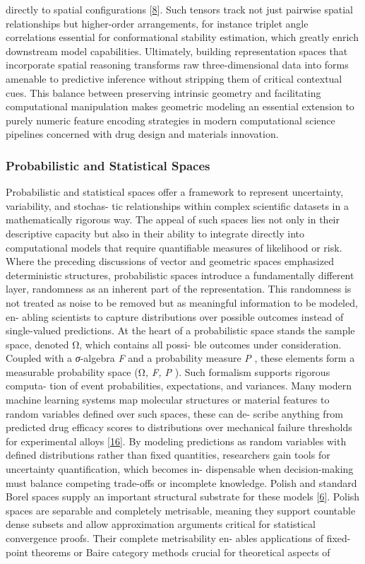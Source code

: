 \documentclass[
]{article}
\begin{document}
directly to spatial configurations {[}\hyperref[_bookmark48]{8}{]}. Such
tensors track not just pairwise spatial relationships but higher-order
arrangements, for instance triplet angle correlations essential for
conformational stability estimation, which greatly enrich downstream
model capabilities. Ultimately, building representation spaces that
incorporate spatial reasoning transforms raw three-dimensional data into
forms amenable to predictive inference without stripping them of
critical contextual cues. This balance between preserving intrinsic
geometry and facilitating computational manipulation makes geometric
modeling an essential extension to purely numeric feature encoding
strategies in modern computational science pipelines concerned with drug
design and materials innovation.

\subsubsection{Probabilistic and Statistical
Spaces}\label{probabilistic-and-statistical-spaces}

Probabilistic and statistical spaces offer a framework to represent
uncertainty, variability, and stochas- tic relationships within complex
scientific datasets in a mathematically rigorous way. The appeal of such
spaces lies not only in their descriptive capacity but also in their
ability to integrate directly into computational models that require
quantifiable measures of likelihood or risk. Where the preceding
discussions of vector and geometric spaces emphasized deterministic
structures, probabilistic spaces introduce a fundamentally different
layer, randomness as an inherent part of the representation. This
randomness is not treated as noise to be removed but as meaningful
information to be modeled, en- abling scientists to capture
distributions over possible outcomes instead of single-valued
predictions. At the heart of a probabilistic space stands the sample
space, denoted Ω, which contains all possi- ble outcomes under
consideration. Coupled with a \emph{σ}-algebra \emph{F} and a
probability measure \emph{P} , these elements form a measurable
probability space (Ω\emph{, F, P} ). Such formalism supports rigorous
computa- tion of event probabilities, expectations, and variances. Many
modern machine learning systems map molecular structures or material
features to random variables defined over such spaces, these can de-
scribe anything from predicted drug efficacy scores to distributions
over mechanical failure thresholds for experimental alloys
{[}\hyperref[_bookmark56]{16}{]}. By modeling predictions as random
variables with defined distributions rather than fixed quantities,
researchers gain tools for uncertainty quantification, which becomes in-
dispensable when decision-making must balance competing trade-offs or
incomplete knowledge. Polish and standard Borel spaces supply an
important structural substrate for these models
{[}\hyperref[_bookmark46]{6}{]}. Polish spaces are separable and
completely metrisable, meaning they support countable dense subsets and
allow approximation arguments critical for statistical convergence
proofs. Their complete metrisability en- ables applications of
fixed-point theorems or Baire category methods crucial for theoretical
aspects of
\end{document}
